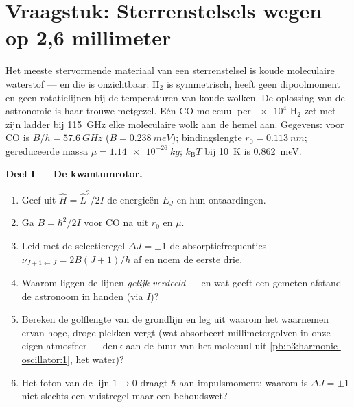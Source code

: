 \section{Vraagstuk: Sterrenstelsels wegen op 2,6 millimeter}

\begin{problem}\label{pb:b3:quantum-angular-momentum:1}
Het meeste stervormende materiaal van een sterrenstelsel is koude
moleculaire waterstof --- en die is onzichtbaar: H$_2$ is symmetrisch,
heeft geen dipoolmoment en geen rotatielijnen bij de temperaturen van
koude wolken. De oplossing van de astronomie is haar trouwe metgezel. Eén
CO-molecuul per $\num{e4}$ H$_2$ zet met zijn ladder bij \qty{115}{GHz}
elke moleculaire wolk aan de hemel aan. Gegevens: voor CO is $B/h = \qty{57.6}{GHz}$ ($B =
\qty{0.238}{meV}$); bindingslengte $r_0 = \qty{0.113}{nm}$; gereduceerde massa $\mu = \qty{1.14e-26}{kg}$;
$k_{\text{B}}T$ bij \qty{10}{K} is \qty{0.862}{meV}.

\medskip\noindent\textbf{Deel I --- De kwantumrotor.}
\begin{enumerate}
  \item Geef uit $\hat H = \hat L^2/2I$ de energieën $E_J$ en hun
        ontaardingen.
  \item Ga $B = \hbar^2/2I$ voor CO na uit $r_0$ en $\mu$.
  \item Leid met de selectieregel $\Delta J = \pm1$ de
        absorptiefrequenties $\nu_{J+1\leftarrow J} = 2B(J+1)/h$ af en
        noem de eerste drie.
  \item Waarom liggen de lijnen \emph{gelijk verdeeld} --- en wat geeft
        een gemeten afstand de astronoom in handen (via $I$)?
  \item Bereken de golflengte van de grondlijn en leg uit waarom het
        waarnemen ervan hoge, droge plekken vergt (wat absorbeert
        millimetergolven in onze eigen atmosfeer --- denk aan de buur van
        het molecuul uit \cref{pb:b3:harmonic-oscillator:1}, het water)?
  \item Het foton van de lijn $1 \to 0$ draagt $\hbar$ aan impulsmoment:
        waarom is $\Delta J = \pm1$ niet slechts een vuistregel maar een
        behoudswet?
\end{enumerate}


\end{problem}
